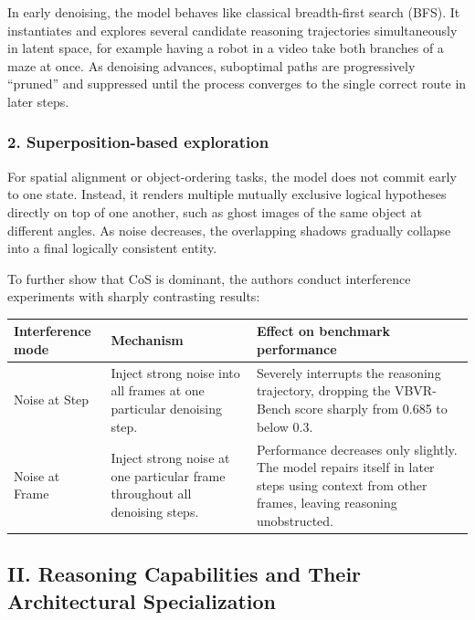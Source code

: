 In early denoising, the model behaves like classical breadth-first search (BFS). It instantiates and explores several candidate reasoning trajectories simultaneously in latent space, for example having a robot in a video take both branches of a maze at once. As denoising advances, suboptimal paths are progressively ``pruned'' and suppressed until the process converges to the single correct route in later steps.

\hypertarget{superposition-based-exploration}{%
\subsubsection{2. Superposition-based exploration}\label{superposition-based-exploration}}

For spatial alignment or object-ordering tasks, the model does not commit early to one state. Instead, it renders multiple mutually exclusive logical hypotheses directly on top of one another, such as ghost images of the same object at different angles. As noise decreases, the overlapping shadows gradually collapse into a final logically consistent entity.

To further show that CoS is dominant, the authors conduct interference experiments with sharply contrasting results:

\begin{longtable}[]{@{}
  >{\raggedright\arraybackslash}p{}
  >{\raggedright\arraybackslash}p{}
  >{\raggedright\arraybackslash}p{}@{}}
\toprule
Interference mode & Mechanism & Effect on benchmark performance \\
\midrule
\endhead
Noise at Step & Inject strong noise into all frames at one particular denoising step. & Severely interrupts the reasoning trajectory, dropping the VBVR-Bench score sharply from 0.685 to below 0.3. \\
Noise at Frame & Inject strong noise at one particular frame throughout all denoising steps. & Performance decreases only slightly. The model repairs itself in later steps using context from other frames, leaving reasoning unobstructed. \\
\bottomrule
\end{longtable}

\hypertarget{ii.-reasoning-capabilities-and-their-architectural-specialization}{%
\subsection{II. Reasoning Capabilities and Their Architectural Specialization}\label{ii.-reasoning-capabilities-and-their-architectural-specialization}}

